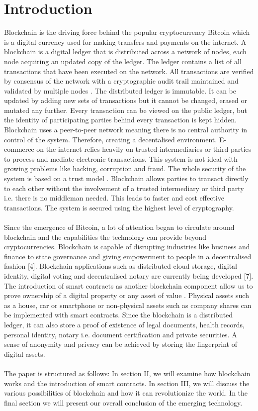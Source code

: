 \documentclass[report]{IEEEtran}
\begin{document}
\section{Introduction}
Blockchain is the driving force behind the popular cryptocurrency Bitcoin which is a digital currency used for making transfers and payments on the internet. A blockchain is a digital ledger that is distributed across a network of nodes, each node acquiring an updated copy of the ledger. The ledger contains a list of all transactions that have been executed on the network. All transactions are verified by consensus of the network with a cryptographic audit trail maintained and validated by multiple nodes \cite{air}. The distributed ledger is immutable. It can be updated by adding new sets of transactions but it cannot be changed, erased or mutated any further. Every transaction can be viewed on the public ledger, but the identity of participating parties behind every transaction is kept hidden. Blockchain uses a peer-to-peer network \cite{bitcoin} meaning there is no central authority in control of the system. Therefore, creating a decentalised environment. E-commerce on the internet relies heavily on trusted intermediaries or third parties to process and mediate electronic transactions. This system is not ideal with growing problems like hacking, corruption and fraud. The whole security of the system is based on a trust model \cite{bitcoin}. Blockchain allows parties to transact directly to each other without the involvement of a trusted intermediary or third party i.e. there is no middleman needed. This leads to faster and cost effective transactions. The system is secured using the highest level of cryptography.
\\\\ Since the emergence of Bitcoin, a lot of attention began to circulate around blockchain and the capabilities the technology can provide beyond cryptocurrencies. Blockchain is capable of disrupting industries like business and finance to state governance and giving empowerment to people in a decentralised fashion [4]. Blockchain applications such as distributed cloud storage, digital identity, digital voting and decentralised notary are currently being developed [7]. The introduction of smart contracts as another blockchain component allow us to prove ownership of a digital property or any asset of value \cite{smartcon}. Physical assets such as a house, car or smartphone or non-physical assets such as company shares can be implemented with smart contracts. Since the blockchain is a distributed ledger, it can also store a proof of existence of legal documents, health records, personal identity, notary i.e. document certification and private securities. A sense of anonymity and privacy can be achieved by storing the fingerprint of digital assets. 
\\\\ The paper is structured as follows: In section II, we will examine how blockchain works and the introduction of smart contracts. In section III, we will discuss the various possibilities of blockchain and how it can revolutionize the world. In the final section we will present our overall conclusion of the emerging technology.
\end{document}
